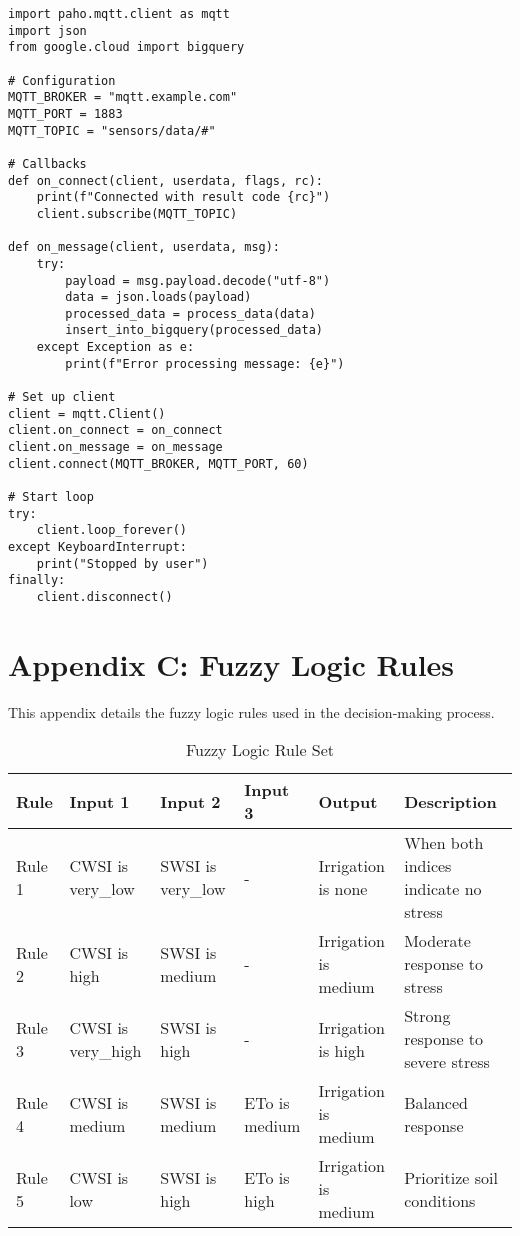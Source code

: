 \begin{lstlisting}
import paho.mqtt.client as mqtt
import json
from google.cloud import bigquery

# Configuration
MQTT_BROKER = "mqtt.example.com"
MQTT_PORT = 1883
MQTT_TOPIC = "sensors/data/#"

# Callbacks
def on_connect(client, userdata, flags, rc):
    print(f"Connected with result code {rc}")
    client.subscribe(MQTT_TOPIC)

def on_message(client, userdata, msg):
    try:
        payload = msg.payload.decode("utf-8")
        data = json.loads(payload)
        processed_data = process_data(data)
        insert_into_bigquery(processed_data)
    except Exception as e:
        print(f"Error processing message: {e}")

# Set up client
client = mqtt.Client()
client.on_connect = on_connect
client.on_message = on_message
client.connect(MQTT_BROKER, MQTT_PORT, 60)

# Start loop
try:
    client.loop_forever()
except KeyboardInterrupt:
    print("Stopped by user")
finally:
    client.disconnect()
\end{lstlisting}

\section{Appendix C: Fuzzy Logic Rules}
\label{app:fuzzy-rules}

This appendix details the fuzzy logic rules used in the decision-making process.

\begin{table}[ht]
  \centering
  \caption{Fuzzy Logic Rule Set}
  \label{tab:fuzzy-rules}
  \begin{tabular}{|l|l|l|l|l|p{5cm}|}
  \hline
  \textbf{Rule} & \textbf{Input 1} & \textbf{Input 2} & \textbf{Input 3} & \textbf{Output} & \textbf{Description} \\ \hline
  Rule 1 & CWSI is very\_low & SWSI is very\_low & - & Irrigation is none & When both indices indicate no stress \\ \hline
  Rule 2 & CWSI is high & SWSI is medium & - & Irrigation is medium & Moderate response to stress \\ \hline
  Rule 3 & CWSI is very\_high & SWSI is high & - & Irrigation is high & Strong response to severe stress \\ \hline
  Rule 4 & CWSI is medium & SWSI is medium & ETo is medium & Irrigation is medium & Balanced response \\ \hline
  Rule 5 & CWSI is low & SWSI is high & ETo is high & Irrigation is medium & Prioritize soil conditions \\ \hline
  \end{tabular}
\end{table}

